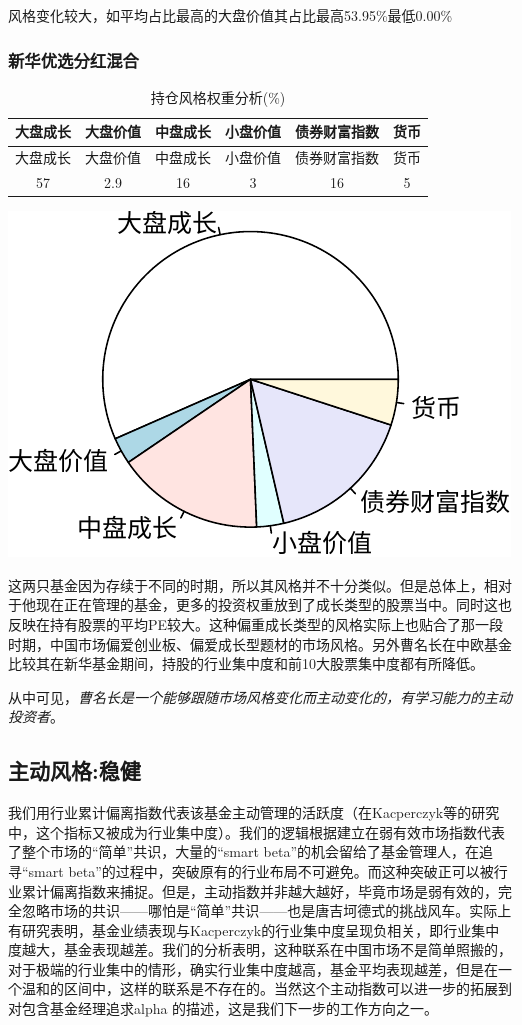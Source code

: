 \documentclass[hyperref,]{ctexart}
\begin{document}
风格变化较大，如平均占比最高的大盘价值其占比最高53.95\%最低0.00\%

\subsubsection{新华优选分红混合}

\begin{longtable}[]{@{}cccccc@{}}
\caption{持仓风格权重分析(\%)}\tabularnewline
\toprule
大盘成长 & 大盘价值 & 中盘成长 & 小盘价值 & 债券财富指数 &
货币\tabularnewline
\midrule
\endfirsthead
\toprule
大盘成长 & 大盘价值 & 中盘成长 & 小盘价值 & 债券财富指数 &
货币\tabularnewline
\midrule
\endhead
57 & 2.9 & 16 & 3 & 16 & 5\tabularnewline
\bottomrule
\end{longtable}

\includegraphics{caominchang-details_files/figure-latex/unnamed-chunk-11-1.pdf}

这两只基金因为存续于不同的时期，所以其风格并不十分类似。但是总体上，相对于他现在正在管理的基金，更多的投资权重放到了成长类型的股票当中。同时这也反映在持有股票的平均PE较大。这种偏重成长类型的风格实际上也贴合了那一段时期，中国市场偏爱创业板、偏爱成长型题材的市场风格。另外曹名长在中欧基金比较其在新华基金期间，持股的行业集中度和前10大股票集中度都有所降低。

从中可见，\emph{曹名长是一个能够跟随市场风格变化而主动变化的，有学习能力的主动投资者}。

\subsection{主动风格:稳健}

我们用行业累计偏离指数代表该基金主动管理的活跃度（在Kacperczyk等的研究中，这个指标又被成为行业集中度）。我们的逻辑根据建立在弱有效市场指数代表了整个市场的``简单''共识，大量的``smart
beta''的机会留给了基金管理人，在追寻``smart
beta''的过程中，突破原有的行业布局不可避免。而这种突破正可以被行业累计偏离指数来捕捉。但是，主动指数并非越大越好，毕竟市场是弱有效的，完全忽略市场的共识------哪怕是``简单''共识------也是唐吉坷德式的挑战风车。实际上有研究表明，基金业绩表现与Kacperczyk的行业集中度呈现负相关，即行业集中度越大，基金表现越差。我们的分析表明，这种联系在中国市场不是简单照搬的，对于极端的行业集中的情形，确实行业集中度越高，基金平均表现越差，但是在一个温和的区间中，这样的联系是不存在的。当然这个主动指数可以进一步的拓展到对包含基金经理追求alpha
的描述，这是我们下一步的工作方向之一。
\end{document}
